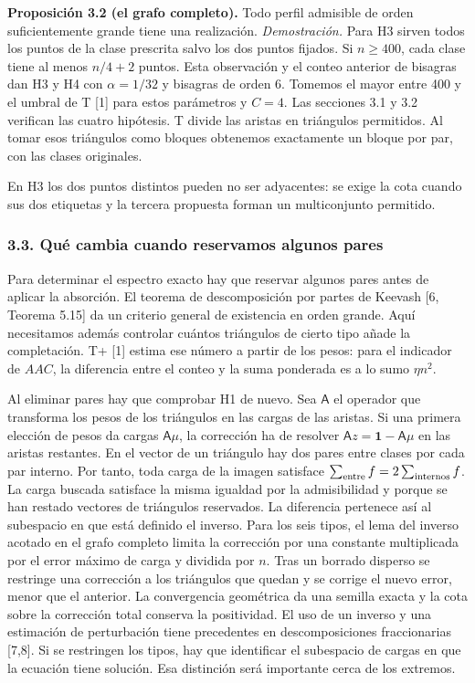 \documentclass[spanish,11pt,a4paper]{article}
\begin{document}
\textbf{Proposición 3.2 (el grafo completo).} Todo perfil admisible de orden suficientemente grande tiene una realización. \emph{Demostración.} Para H3 sirven todos los puntos de la clase prescrita salvo los dos puntos fijados. Si \(n\ge400\), cada clase tiene al menos \(n/4+2\) puntos. Esta observación y el conteo anterior de bisagras dan H3 y H4 con \(\alpha=1/32\) y bisagras de orden 6. Tomemos el mayor entre 400 y el umbral de T {[}1{]} para estos parámetros y \(C=4\). Las secciones 3.1 y 3.2 verifican las cuatro hipótesis. T divide las aristas en triángulos permitidos. Al tomar esos triángulos como bloques obtenemos exactamente un bloque por par, con las clases originales.

En H3 los dos puntos distintos pueden no ser adyacentes: se exige la cota cuando sus dos etiquetas y la tercera propuesta forman un multiconjunto permitido.

\subsubsection{3.3. Qué cambia cuando reservamos algunos pares}\label{quuxe9-cambia-cuando-reservamos-algunos-pares}

Para determinar el espectro exacto hay que reservar algunos pares antes de aplicar la absorción. El teorema de descomposición por partes de Keevash {[}6, Teorema 5.15{]} da un criterio general de existencia en orden grande. Aquí necesitamos además controlar cuántos triángulos de cierto tipo añade la completación. T+ {[}1{]} estima ese número a partir de los pesos: para el indicador de \(AAC\), la diferencia entre el conteo y la suma ponderada es a lo sumo \(\eta n^2\).

Al eliminar pares hay que comprobar H1 de nuevo. Sea \(\mathsf A\) el operador que transforma los pesos de los triángulos en las cargas de las aristas. Si una primera elección de pesos da cargas \(\mathsf A\mu\), la corrección ha de resolver \(\mathsf A z=\mathbf1-\mathsf A\mu\) en las aristas restantes. En el vector de un triángulo hay dos pares entre clases por cada par interno. Por tanto, toda carga de la imagen satisface \(\sum_{\rm entre} f=2\sum_{\rm internos} f\). La carga buscada satisface la misma igualdad por la admisibilidad y porque se han restado vectores de triángulos reservados. La diferencia pertenece así al subespacio en que está definido el inverso. Para los seis tipos, el lema del inverso acotado en el grafo completo limita la corrección por una constante multiplicada por el error máximo de carga y dividida por \(n\). Tras un borrado disperso se restringe una corrección a los triángulos que quedan y se corrige el nuevo error, menor que el anterior. La convergencia geométrica da una semilla exacta y la cota sobre la corrección total conserva la positividad. El uso de un inverso y una estimación de perturbación tiene precedentes en descomposiciones fraccionarias {[}7,8{]}. Si se restringen los tipos, hay que identificar el subespacio de cargas en que la ecuación tiene solución. Esa distinción será importante cerca de los extremos.
\end{document}
